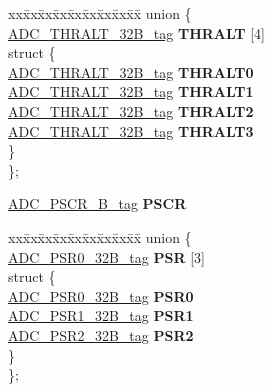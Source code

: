 \begin{DoxyCompactItemize}
\begin{tabbing}
\end{tabbing}\item 
\mbox{\label{structADC__struct__tag_a1f4f5653565f9cdbb5ec80ebffa3d95a}} 
\begin{tabbing}
xx\=xx\=xx\=xx\=xx\=xx\=xx\=xx\=xx\=\kill
union \{\\
\>\mbox{\hyperlink{unionADC__THRALT__32B__tag}{ADC\_THRALT\_32B\_tag}} {\bfseries THRALT} \mbox{[}4\mbox{]}\\
\mbox{\label{unionADC__struct__tag_1_1_0D1820_a5087a9b47dff4b56c09b2b7318c8df73}} 
\>struct \{\\
\>\>\mbox{\hyperlink{unionADC__THRALT__32B__tag}{ADC\_THRALT\_32B\_tag}} {\bfseries THRALT0}\\
\>\>\mbox{\hyperlink{unionADC__THRALT__32B__tag}{ADC\_THRALT\_32B\_tag}} {\bfseries THRALT1}\\
\>\>\mbox{\hyperlink{unionADC__THRALT__32B__tag}{ADC\_THRALT\_32B\_tag}} {\bfseries THRALT2}\\
\>\>\mbox{\hyperlink{unionADC__THRALT__32B__tag}{ADC\_THRALT\_32B\_tag}} {\bfseries THRALT3}\\
\>\} \\
\}; \\

\end{tabbing}\item 
\mbox{\label{structADC__struct__tag_a72d9c0366348f8e2ac18fce031c5e53c}} 
\mbox{\hyperlink{unionADC__PSCR__32B__tag}{A\+D\+C\+\_\+\+P\+S\+C\+R\+\_\+B\+\_\+tag}} {\bfseries P\+S\+CR}
\item 
\mbox{\label{structADC__struct__tag_aaa2975c9f490e9c69457e863771ebdd3}} 
\begin{tabbing}
xx\=xx\=xx\=xx\=xx\=xx\=xx\=xx\=xx\=\kill
union \{\\
\>\mbox{\hyperlink{unionADC__PSR0__32B__tag}{ADC\_PSR0\_32B\_tag}} {\bfseries PSR} \mbox{[}3\mbox{]}\\
\mbox{\label{unionADC__struct__tag_1_1_0D1822_a830427ff0e7aea5bf8f0ef7a88245afe}} 
\>struct \{\\
\>\>\mbox{\hyperlink{unionADC__PSR0__32B__tag}{ADC\_PSR0\_32B\_tag}} {\bfseries PSR0}\\
\>\>\mbox{\hyperlink{unionADC__PSR1__32B__tag}{ADC\_PSR1\_32B\_tag}} {\bfseries PSR1}\\
\>\>\mbox{\hyperlink{unionADC__PSR2__32B__tag}{ADC\_PSR2\_32B\_tag}} {\bfseries PSR2}\\
\>\} \\
\}; \\


\end{tabbing}
\end{DoxyCompactItemize}
